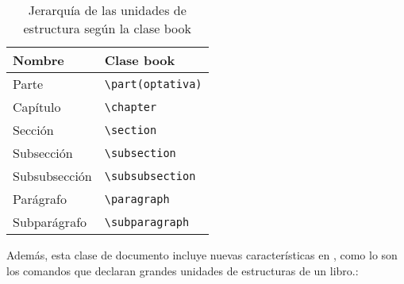 	\begin{table}[tbh]
  		 \begin{center}
    		    \leavevmode
		    \begin{tabular}{|l|l|}
      		    \hline
			\textbf{Nombre} & \textbf{Clase book}\\
		    \hline
		    \hline
      			Parte & \verb|\part(optativa)|  \\
		    \hline
      			Capítulo   &  \verb|\chapter|\\
      		    
      			Sección &  \verb|\section|     \\
		    
        		Subsección & \verb|\subsection|   \\
		    
      			Subsubsección  & \verb|\subsubsection|    \\
		    
			Parágrafo & \verb|\paragraph|\\
		    
			Subparágrafo & \verb|\subparagraph|\\
		    \hline
    		    \end{tabular}
  		\end{center}
  		  \caption{Jerarquía de las unidades de estructura según la clase book}
	 	  \label{tab:jerarbook}
	       \end{table}





 Además, esta clase de documento incluye nuevas características en \LaTeXe{}, como lo son los comandos que declaran grandes unidades de estructuras de un libro.:

